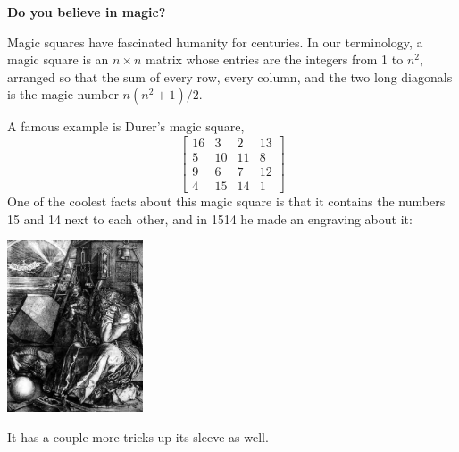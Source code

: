 \documentclass[11pt]{article}
\begin{document}
\begin{center}
  \bf Do you believe in magic?
\end{center}

Magic squares have fascinated humanity for centuries. In our
terminology, a magic square is an $n\times n$ matrix whose entries are
the integers from 1 to $n^2$, arranged so that the sum of every row,
every column, and the two long diagonals is the magic number
$n(n^2+1)/2$. 

A famous example is Durer's magic square,
\[
\begin{bmatrix}
  16 & 3 & 2 & 13 \\ 5 & 10 & 11 & 8 \\ 9 & 6 & 7 & 12 \\ 4 & 15 & 14 & 1
\end{bmatrix}
\]
One of the coolest facts about this magic square is that it contains the numbers 15 and 14 next to each other, and in 1514 he made an engraving about it:
\begin{center}
  \includegraphics[height=2in]{durer}
\end{center}
It has a couple more tricks up its sleeve as well.
\end{document}
